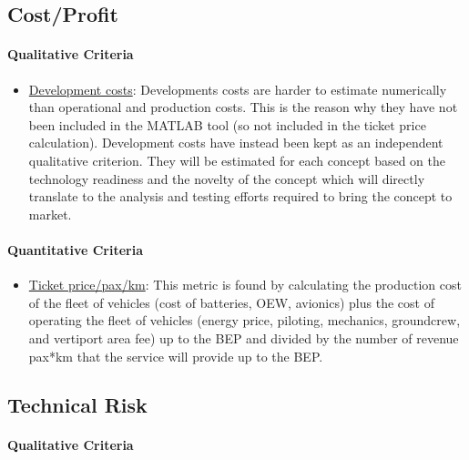 \subsection{Cost/Profit}

\paragraph{Qualitative Criteria}


\begin{itemize}
    \item \underline{Development costs}: Developments costs are harder to estimate numerically than operational and production costs. This is the reason why they have not been included in the MATLAB tool (so not included in the ticket price calculation). Development costs have instead been kept as an independent qualitative criterion. They will be estimated for each concept based on the technology readiness and the novelty of the concept which will directly translate to the analysis and testing efforts required to bring the concept to market.
\end{itemize}

\paragraph{Quantitative Criteria}



\begin{itemize}
   \item \underline{Ticket price/pax/km}: This metric is found by calculating the production cost of the fleet of vehicles (cost of batteries, OEW, avionics) plus the cost of operating the fleet of vehicles (energy price, piloting, mechanics, groundcrew, and vertiport area fee) up to the BEP and divided by the number of revenue pax*km that the service will provide up to the BEP. 
\end{itemize}

\subsection{Technical Risk}

\paragraph{Qualitative Criteria}

